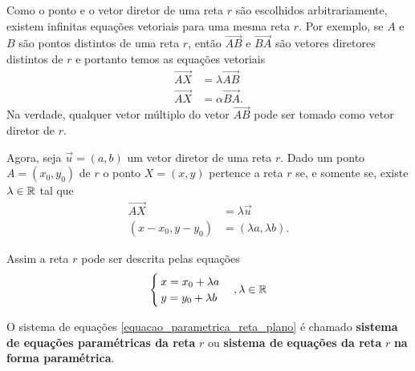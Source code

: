 \begin{observacao}
    Como o ponto e o vetor diretor de uma reta $r$ são escolhidos arbitrariamente, existem infinitas equações vetoriais para uma mesma reta $r$. Por exemplo, se $A$ e $B$ são pontos distintos de uma reta $r$, então $\vec{AB}$ e $\vec{BA}$ são vetores diretores distintos de $r$ e portanto temos as equações vetoriais
    \begin{align*}
        \vec{AX} & = \lambda\vec{AB} \\
        \vec{AX} & = \alpha\vec{BA}.
    \end{align*}
    Na verdade, qualquer vetor múltiplo do vetor $\vec{AB}$ pode ser tomado como vetor diretor de $r$.
\end{observacao}

Agora, seja $\vec{u} = (a, b)$ um vetor diretor de uma reta $r$. Dado um ponto $A = (x_0, y_0)$ de $r$ o ponto $X = (x, y)$ pertence a reta $r$ se, e somente se, existe $\lambda \in \mathbb{R}$ tal que
\begin{align*}
    \vec{AX}           & = \lambda\vec{u}          \\
    (x - x_0, y - y_0) & = (\lambda a, \lambda b).
\end{align*}

Assim a reta $r$ pode ser descrita pelas equações
\begin{equation}\label{equacao_parametrica_reta_plano}
    \begin{cases}
        x = x_0 + \lambda a \\
        y = y_0 + \lambda b
    \end{cases}, \lambda \in \mathbb{R}
\end{equation}

\begin{definicao}
    O sistema de equações \eqref{equacao_parametrica_reta_plano} é chamado \textbf{sistema de equações paramétricas da reta} $r$ ou \textbf{sistema de equações da reta} $r$ \textbf{na forma paramétrica}.
\end{definicao}

